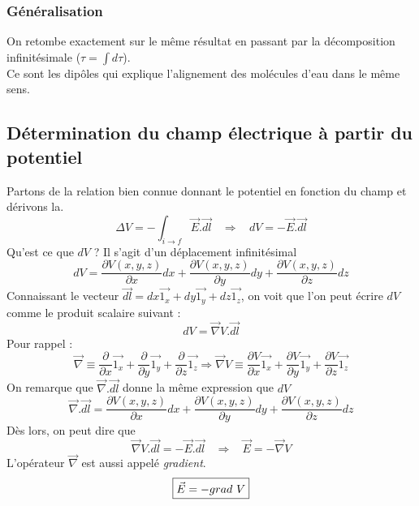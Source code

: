 \documentclass	[11pt, a4paper, openany]{book}
\begin{document}
\subsubsection{Généralisation}
On retombe exactement sur le même résultat en passant par la décomposition infinitésimale ($\tau = \int d\tau$).\\
Ce sont les dipôles qui explique l'alignement des molécules d'eau dans le même sens.

\subsection{Détermination du champ électrique à partir du potentiel}
Partons de la relation bien connue donnant le potentiel en fonction du champ et dérivons la.
\begin{equation}
	\Delta V = - \int_{i\rightarrow f} \vec{E}.\vec{dl}\ \ \ \ \Rightarrow\ \ \ \ dV = - \vec{E}.\vec{dl}
\end{equation}
Qu'est ce que $dV$ ? Il s'agit d'un déplacement infinitésimal 
\begin{equation}
	dV = \frac{\partial V(x,y,z)}{\partial x}dx + \frac{\partial V(x,y,z)}{\partial y}dy + \frac{\partial V(x,y,z)}{\partial z}dz
\end{equation}
Connaissant le vecteur $\vec{dl} = dx\vec{1_x} + dy\vec{1_y}+dz\vec{1_z}$, on voit que l'on peut écrire $dV$ comme le produit scalaire suivant :
\begin{equation}
	dV = \vec{\nabla}V.\vec{dl}
\end{equation}
Pour rappel : 
\begin{equation}
	\vec{\nabla} \equiv \frac{\partial}{\partial x}\vec{1_x} + \frac{\partial}{\partial y}\vec{1_y} + \frac{\partial}{\partial z}\vec{1_z} \Rightarrow \vec{\nabla}V \equiv \frac{\partial V}{\partial x}\vec{1_x} + \frac{\partial V}{\partial y}\vec{1_y} + \frac{\partial V}{\partial z}\vec{1_z}
\end{equation}
On remarque que $\vec{\nabla}.\vec{dl}$ donne la même expression que $dV$
\begin{equation}
	\vec{\nabla}.\vec{dl} = \frac{\partial V(x,y,z)}{\partial x}dx + \frac{\partial V(x,y,z)}{\partial y}dy + \frac{\partial V(x,y,z)}{\partial z}dz
\end{equation}
Dès lors, on peut dire que 
\begin{equation}
	\vec{\nabla}V.\vec{dl} = -\vec{E}.\vec{dl}\ \ \ \ \Rightarrow\ \ \ \ \vec{E} = - \vec{\nabla}V
\end{equation}
L'opérateur $\vec{\nabla}$ est aussi appelé \textit{gradient}.
\begin{equation}
	\fbox{$\vec{E} = -grad\ V$}
\end{equation}
\end{document}
